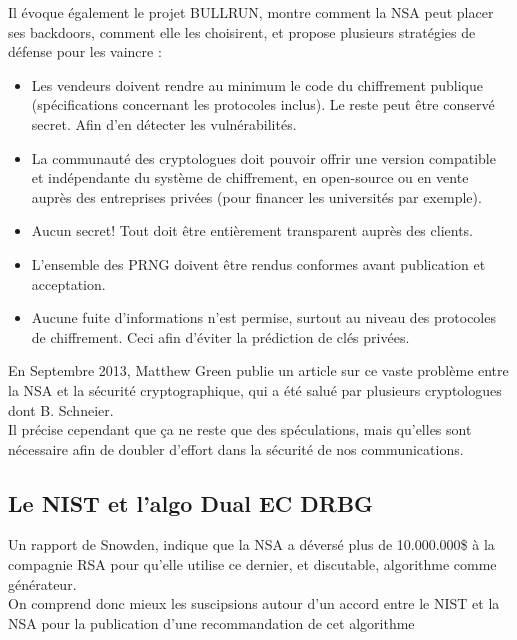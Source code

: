 	Il évoque également le projet BULLRUN, montre comment la NSA
	peut placer ses backdoors, comment elle les choisirent, 
	et propose plusieurs stratégies de défense \cite{schneier2013NSA}
	pour les vaincre : \\
	\begin{itemize}
	\item Les vendeurs doivent rendre au minimum le code du chiffrement
	publique (spécifications concernant les protocoles inclus). Le reste
	peut être conservé secret. Afin d'en détecter les vulnérabilités.
	\item La communauté des cryptologues doit pouvoir offrir une version
	compatible et indépendante du système de chiffrement, en open-source
	ou en vente auprès des entreprises privées (pour financer les
	universités par exemple).
	\item Aucun secret! Tout doit être entièrement transparent auprès des
	clients.
	\item L'ensemble des PRNG doivent être rendus conformes avant 
	publication et acceptation.
	\item Aucune fuite d'informations n'est permise, surtout au niveau
	des protocoles de chiffrement. Ceci afin d'éviter la prédiction de
	clés privées.
	\end{itemize}
	
	En Septembre 2013, Matthew Green publie un article \cite{green2013NSA}
	sur ce vaste problème entre la NSA et la sécurité cryptographique, qui
	a été salué par plusieurs cryptologues dont B. Schneier.\\
	
	Il précise cependant que ça ne reste que des spéculations, mais
	qu'elles sont nécessaire afin de doubler d'effort dans la sécurité
	de nos communications.\\


	\subsection{Le NIST et l'algo Dual EC DRBG}
	
	Un rapport de Snowden, indique que la NSA a déversé plus de 10.000.000\$ à 
	la compagnie RSA \cite{ravi2013NSA} pour qu'elle utilise ce dernier, 
	et discutable, algorithme comme générateur. \\
	On comprend donc mieux les suscipsions autour d'un accord entre le NIST et 
	la NSA pour la publication d'une recommandation de cet algorithme\\	
	

